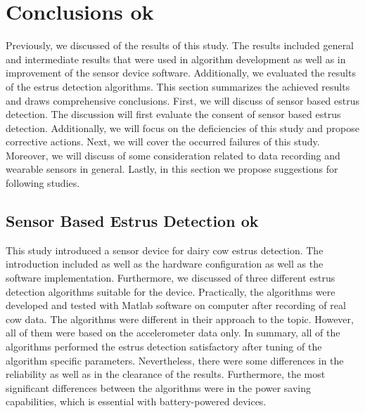 \documentclass[english,12pt,a4paper,pdftex,elec,utf8]{aaltothesis}
\begin{document}
\section{Conclusions ok} \label{conclusionssection}

Previously, we discussed of the results of this study. The results included general and intermediate results that were used in algorithm development as well as in improvement of the sensor device software. Additionally, we evaluated the results of the estrus detection algorithms. This section summarizes the achieved results and draws comprehensive conclusions. First, we will discuss of sensor based estrus detection. The discussion will first evaluate the consent of sensor based estrus detection. Additionally, we will focus on the deficiencies of this study and propose corrective actions. Next, we will cover the occurred failures of this study. Moreover, we will discuss of some consideration related to data recording and wearable sensors in general. Lastly, in this section we propose suggestions for following studies.

\subsection{Sensor Based Estrus Detection ok}

This study introduced a sensor device for dairy cow estrus detection. The introduction included as well as the hardware configuration as well as the software implementation. Furthermore, we discussed of three different estrus detection algorithms suitable for the device. Practically, the algorithms were developed and tested with Matlab software on computer after recording of real cow data. The algorithms were different in their approach to the topic. However, all of them were based on the accelerometer data only. In summary, all of the algorithms performed the estrus detection satisfactory after tuning of the algorithm specific parameters. Nevertheless, there were some differences in the reliability as well as in the clearance of the results. Furthermore, the most significant differences between the algorithms were in the power saving capabilities, which is essential with battery-powered devices.
\end{document}

